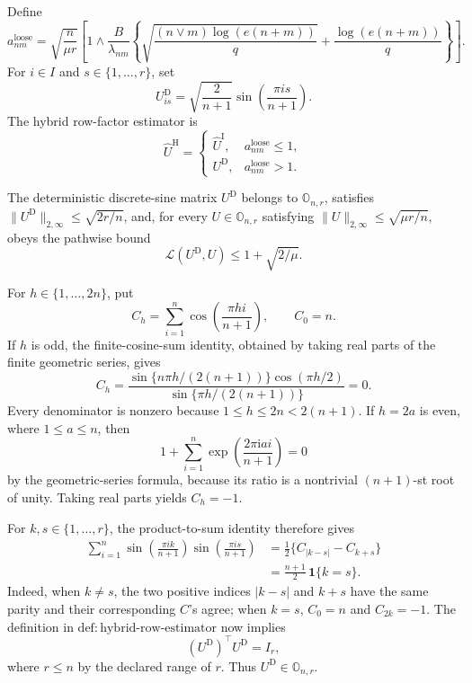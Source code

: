 Define
\[
 a^{\mathrm{loose}}_{nm}=
 \sqrt{\frac n{\mu r}}\left[1\wedge
 \frac B{\lambda_{nm}}\left\{
 \sqrt{\frac{(n\vee m)\log(e(n+m))}{q}}+
 \frac{\log(e(n+m))}{q}\right\}\right].
\]
For \(i\in I\) and \(s\in\{1,\ldots,r\}\), set
\[
 U^{\mathrm D}_{is}=\sqrt{\frac{2}{n+1}}
 \sin\!\left(\frac{\pi i s}{n+1}\right).
\]
The hybrid row-factor estimator is
\[
 \widehat U^{\mathrm H}=
 \begin{cases}
 \widehat U^{\mathrm I},&a^{\mathrm{loose}}_{nm}\le1,\\
 U^{\mathrm D},&a^{\mathrm{loose}}_{nm}>1.
 \end{cases}
\]

The deterministic discrete-sine matrix \(U^{\mathrm D}\) belongs to \(\mathbb O_{n,r}\), satisfies \(\lVert U^{\mathrm D}\rVert_{2,\infty}\le\sqrt{2r/n}\), and, for every \(U\in\mathbb O_{n,r}\) satisfying \(\lVert U\rVert_{2,\infty}\le\sqrt{\mu r/n}\), obeys the pathwise bound
\[
 \mathcal L(U^{\mathrm D},U)\le1+\sqrt{2/\mu}.
\]

For \(h\in\{1,\ldots,2n\}\), put
\[
 C_h=\sum_{i=1}^n\cos\!\left(\frac{\pi h i}{n+1}\right),
 \qquad C_0=n.
\]
If \(h\) is odd, the finite-cosine-sum identity, obtained by taking real parts of the finite geometric series, gives
\[
 C_h=
 \frac{\sin\{n\pi h/(2(n+1))\}\cos(\pi h/2)}
      {\sin\{\pi h/(2(n+1))\}}=0.
\]
Every denominator is nonzero because \(1\le h\le2n<2(n+1)\).  If \(h=2a\) is even, where \(1\le a\le n\), then
\[
 1+\sum_{i=1}^n\exp\!\left(\frac{2\pi\mathrm i a i}{n+1}\right)=0
\]
by the geometric-series formula, because its ratio is a nontrivial \((n+1)\)-st root of unity.  Taking real parts yields \(C_h=-1\).

For \(k,s\in\{1,\ldots,r\}\), the product-to-sum identity therefore gives
\[
 \begin{aligned}
 \sum_{i=1}^n
 \sin\!\left(\frac{\pi i k}{n+1}\right)
 \sin\!\left(\frac{\pi i s}{n+1}\right)
 &=\frac12\{C_{|k-s|}-C_{k+s}\}\\
 &=\frac{n+1}{2}\,\mathbf1\{k=s\}.
 \end{aligned}
\]
Indeed, when \(k\ne s\), the two positive indices \(|k-s|\) and \(k+s\) have the same parity and their corresponding \(C\)'s agree; when \(k=s\), \(C_0=n\) and \(C_{2k}=-1\).  The definition in \(\mathrm{def:hybrid\mbox{-}row\mbox{-}estimator}\) now implies
\[
 (U^{\mathrm D})^\top U^{\mathrm D}=I_r,
\]
where \(r\le n\) by the declared range of \(r\).  Thus \(U^{\mathrm D}\in\mathbb O_{n,r}\).

